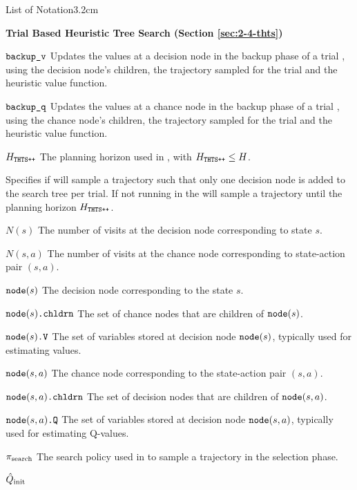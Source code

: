 \begin{mclistof}{List of Notation}{3.2cm}
    \\
    \item[{\parbox[t]{\textwidth}{
        \Large\textbf{Trial Based Heuristic Tree Search (Section \ref{sec:2-4-thts})}\hfill\hfill
      }}]
    \item[${\textnormal{\texttt{backup\_v}}}$]
        Updates the values at a decision node in the backup phase of a trial \thtspp, using the decision node's children, the trajectory sampled for the trial and the heuristic value function.
    \item[${\textnormal{\texttt{backup\_q}}}$] 
        Updates the values at a chance node in the backup phase of a trial \thtspp, using the chance node's children, the trajectory sampled for the trial and the heuristic value function.
    \item[$H_{{\textnormal{\texttt{THTS++}}}}$]
        The planning horizon used in \thtspp, with $H_{{\textnormal{\texttt{THTS++}}}}\leq H$.
    \item[\mctsmode] 
        Specifies if \thtspp\ewe will sample a trajectory such that only one decision node is added to the search tree per trial. If not running in \mctsmode\ewe the \thtspp\ewe will sample a trajectory until the planning horizon $H_{{\textnormal{\texttt{THTS++}}}}$.
    \item[$N(s)$]
        The number of visits at the decision node corresponding to state $s$.
    \item[$N(s,a)$]
        The number of visits at the chance node corresponding to state-action pair $(s,a)$.
    \item[${\textnormal{\texttt{node}}}(s)$] 
        The decision node corresponding to the state $s$.
    \item[${\textnormal{\texttt{node}}}(s){\textnormal{\texttt{.chldrn}}}$]
        The set of chance nodes that are children of ${\textnormal{\texttt{node}}}(s)$.
    \item[${{\textnormal{\texttt{node}}}(s)\textnormal{\texttt{.V}}}$]
        The set of variables stored at decision node ${\textnormal{\texttt{node}}}(s)$, typically used for estimating values.
    \item[${\textnormal{\texttt{node}}}(s,a)$] 
        The chance node corresponding to the state-action pair $(s,a)$.
    \item[${\textnormal{\texttt{node}}}(s,a){\textnormal{\texttt{.chldrn}}}$]
        The set of decision nodes that are children of ${\textnormal{\texttt{node}}}(s,a)$.
    \item[${{\textnormal{\texttt{node}}}(s,a)\textnormal{\texttt{.Q}}}$] 
        The set of variables stored at decision node ${\textnormal{\texttt{node}}}(s,a)$, typically used for estimating Q-values.
    \item[${\pi_{\textnormal{search}}}$]
        The search policy used in \thtspp\ewe to sample a trajectory in the selection phase.
    \item[${\hat{Q}_{\textnormal{init}}}$]

\end{mclistof}

